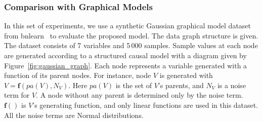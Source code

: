 \documentclass[sigconf, anonymous, review]{acmart}
\theoremstyle{plain}
\theoremstyle{definition}
\theoremstyle{remark}
\begin{document}
\subsubsection{Comparison with Graphical Models}

In this set of experiments, we use a synthetic  Gaussian graphical model dataset from bnlearn~\cite{bnlearn} to evaluate the proposed model. The data graph structure is given. The dataset consists of 7 variables and 5\,000 samples.  Sample values at each node are generated according to a  structured causal model with  a  diagram given by Figure~\ref{fig:gaussian_graph}. Each node represents a variable generated with a function of its parent nodes. For instance, node $V$ is generated with  $V= \mathbf{f}(pa(V), N_V)$. Here $pa(V)$ is the set of $V$'s parents, and $N_V$ is a noise term for $V$.    A node without any parent is determined only by the noise term.  $\mathbf{f}()$ is $V$'s generating function, and  only linear functions are used in this dataset. All the noise terms are Normal distributions. 
\end{document}
